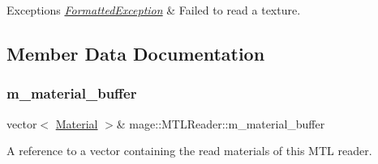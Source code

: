 \begin{DoxyExceptions}{Exceptions}
{\em \hyperlink{classmage_1_1_formatted_exception}{Formatted\+Exception}} & Failed to read a texture. \\
\hline
\end{DoxyExceptions}


\subsection{Member Data Documentation}
\hypertarget{classmage_1_1_m_t_l_reader_a6382e0e9fce6581b129d18f5d82994c2}{}\label{classmage_1_1_m_t_l_reader_a6382e0e9fce6581b129d18f5d82994c2} 
\subsubsection{\texorpdfstring{m\+\_\+material\+\_\+buffer}{m\_material\_buffer}}
{\footnotesize\ttfamily vector$<$ \hyperlink{classmage_1_1_material}{Material} $>$\& mage\+::\+M\+T\+L\+Reader\+::m\+\_\+material\+\_\+buffer\hspace{0.3cm}{\ttfamily [private]}}

A reference to a vector containing the read materials of this M\+TL reader. 
